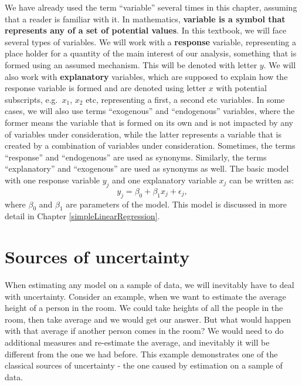 \documentclass[
]{book}
\theoremstyle{definition}
\theoremstyle{definition}
\theoremstyle{definition}
\theoremstyle{definition}
\theoremstyle{remark}
\begin{document}
We have already used the term ``variable'' several times in this chapter, assuming that a reader is familiar with it. In mathematics, \textbf{variable is a symbol that represents any of a set of potential values}. In this textbook, we will face several types of variables. We will work with a \textbf{response} variable, representing a place holder for a quantity of the main interest of our analysis, something that is formed using an assumed mechanism. This will be denoted with letter \(y\). We will also work with \textbf{explanatory} variables, which are supposed to explain how the response variable is formed and are denoted using letter \(x\) with potential subscripts, e.g.~\(x_1\), \(x_2\) etc, representing a first, a second etc variables. In some cases, we will also use terms ``exogenous'' and ``endogenous'' variables, where the former means the variable that is formed on its own and is not impacted by any of variables under consideration, while the latter represents a variable that is created by a combination of variables under consideration. Sometimes, the terms ``response'' and ``endogenous'' are used as synonyms. Similarly, the terms ``explanatory'' and ``exogenous'' are used as synonyms as well. The basic model with one response variable \(y_j\) and one explanatory variable \(x_j\) can be written as:
\begin{equation*}
    y_j = \beta_0 + \beta_1 x_j + \epsilon_j ,
\end{equation*}
where \(\beta_0\) and \(\beta_1\) are parameters of the model. This model is discussed in more detail in Chapter \ref{simpleLinearRegression}.

\hypertarget{sourcesOfUncertainty}{%
\section{Sources of uncertainty}\label{sourcesOfUncertainty}}

When estimating any model on a sample of data, we will inevitably have to deal with uncertainty. Consider an example, when we want to estimate the average height of a person in the room. We could take heights of all the people in the room, then take average and we would get our answer. But what would happen with that average if another person comes in the room? We would need to do additional measures and re-estimate the average, and inevitably it will be different from the one we had before. This example demonstrates one of the classical sources of uncertainty - the one caused by estimation on a sample of data.
\end{document}
